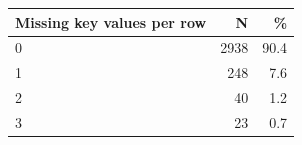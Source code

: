 \begin{threeparttable}


\begin{tabular}{@{}lrr@{}}


\toprule


\textbf{Missing key values per row} & \textbf{N} & \textbf{\%} \\


\midrule


\midrule
0           &        2938&        90.4\\
1           &         248&         7.6\\
2           &          40&         1.2\\
3           &          23&         0.7\\
\bottomrule


\end{tabular}


\end{threeparttable}
